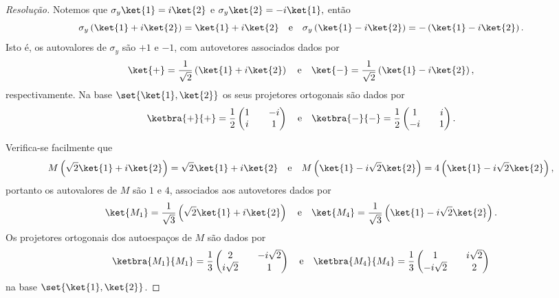 \begin{proof}[Resolução]
    Notemos que \(\sigma_y\ket{1} = i \ket{2}\) e \(\sigma_y \ket{2} = -i \ket{1},\) então
    \begin{equation*}
        \sigma_y \left(\ket{1} + i\ket{2}\right) = \ket{1} + i\ket{2}\quad\text{e}\quad \sigma_y \left(\ket{1} - i \ket{2}\right) = -\left(\ket{1} - i\ket{2}\right).
    \end{equation*}
    Isto é, os autovalores de \(\sigma_y\) são \(+1\) e \(-1\), com autovetores associados dados por
    \begin{equation*}
        \ket{+} = \frac1{\sqrt{2}}\left(\ket{1} + i\ket{2}\right)
        \quad\text{e}\quad
        \ket{-} = \frac1{\sqrt{2}}\left(\ket{1} - i\ket{2}\right),
    \end{equation*}
    respectivamente. Na base \(\set{\ket{1}, \ket{2}}\) os seus projetores ortogonais são dados por
    \begin{equation*}
        \ketbra{+}{+} = \frac12\begin{pmatrix}
            1 && -i\\
            i && 1
        \end{pmatrix}
        \quad\text{e}\quad
        \ketbra{-}{-} = \frac12 \begin{pmatrix}
            1 && i\\
            -i&& 1
        \end{pmatrix}.
    \end{equation*}

    Verifica-se facilmente que
    \begin{equation*}
        M\left(\sqrt{2}\ket{1} + i \ket{2}\right) = \sqrt{2}\ket{1} + i \ket{2}
        \quad\text{e}\quad
        M\left(\ket{1} - i \sqrt{2} \ket{2}\right) = 4\left(\ket{1} - i\sqrt{2}\ket{2}\right),
    \end{equation*}
    portanto os autovalores de \(M\) são \(1\) e \(4\), associados aos autovetores dados por
    \begin{equation*}
        \ket{M_1} = \frac{1}{\sqrt{3}}\left(\sqrt{2} \ket{1} + i \ket{2}\right)
        \quad\text{e}\quad
        \ket{M_4} = \frac{1}{\sqrt{3}}\left(\ket{1} - i \sqrt{2}\ket{2}\right).
    \end{equation*}
    Os projetores ortogonais dos autoespaços de \(M\) são dados por
    \begin{equation*}
        \ketbra{M_1}{M_1} = \frac13 \begin{pmatrix}
            2 && -i\sqrt{2}\\
            i\sqrt{2} && 1
        \end{pmatrix}
        \quad\text{e}\quad
        \ketbra{M_4}{M_4} = \frac13 \begin{pmatrix}
            1 && i\sqrt{2}\\
            -i\sqrt{2} && 2
        \end{pmatrix}
    \end{equation*}
    na base \(\set{\ket{1}, \ket{2}}\).


\end{proof}
